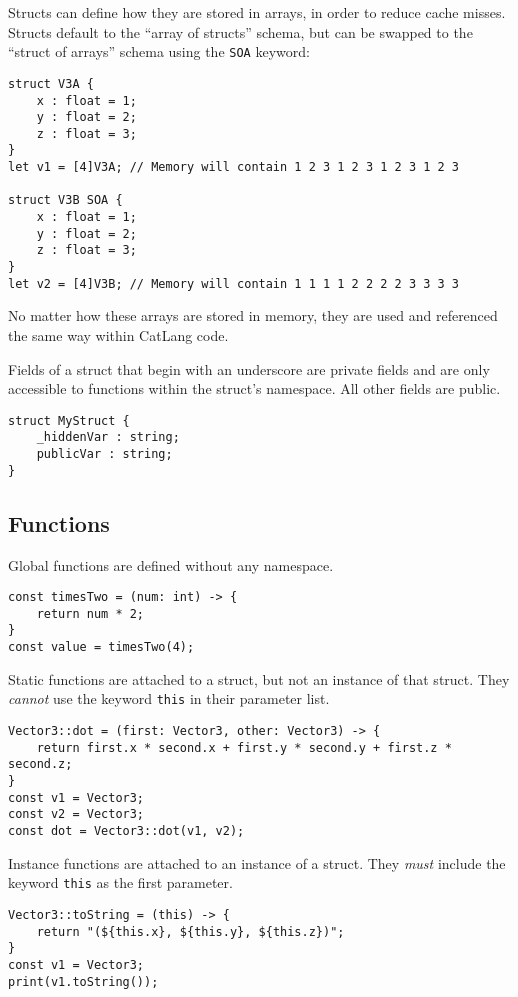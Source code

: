 \documentclass[12pt]{article}
\begin{document}
Structs can define how they are stored in arrays, in order to reduce cache misses. Structs default to the ``array of structs'' schema, but can be swapped to the ``struct of arrays'' schema using the \lstinline!SOA! keyword:

\begin{lstlisting}
struct V3A {
	x : float = 1;
	y : float = 2;
	z : float = 3;
}
let v1 = [4]V3A; // Memory will contain 1 2 3 1 2 3 1 2 3 1 2 3

struct V3B SOA {
	x : float = 1;
	y : float = 2;
	z : float = 3;
}
let v2 = [4]V3B; // Memory will contain 1 1 1 1 2 2 2 2 3 3 3 3
\end{lstlisting}

No matter how these arrays are stored in memory, they are used and referenced the same way within CatLang code.

Fields of a struct that begin with an underscore are private fields and are only accessible to functions within the struct's namespace. All other fields are public.

\begin{lstlisting}
struct MyStruct {
	_hiddenVar : string;
	publicVar : string;
}
\end{lstlisting}

\subsection{Functions}

Global functions are defined without any namespace.

\begin{lstlisting}
const timesTwo = (num: int) -> {
	return num * 2;
}
const value = timesTwo(4);
\end{lstlisting}

Static functions are attached to a struct, but not an instance of that struct. They \emph{cannot} use the keyword \lstinline!this! in their parameter list.

\begin{lstlisting}
Vector3::dot = (first: Vector3, other: Vector3) -> {
	return first.x * second.x + first.y * second.y + first.z * second.z;
}
const v1 = Vector3;
const v2 = Vector3;
const dot = Vector3::dot(v1, v2);
\end{lstlisting}

Instance functions are attached to an instance of a struct. They \emph{must} include the keyword \lstinline!this! as the first parameter.

\begin{lstlisting}
Vector3::toString = (this) -> {
	return "(${this.x}, ${this.y}, ${this.z})";
}
const v1 = Vector3;
print(v1.toString());
\end{lstlisting}
\end{document}
